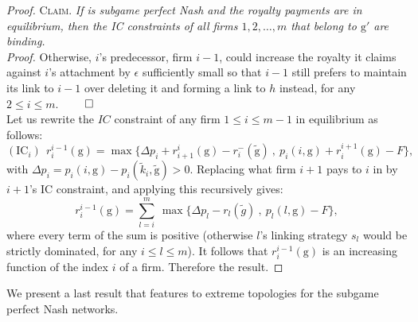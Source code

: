 \documentclass{article}
\begin{document}
\begin{proof}
\indent \textsc{Claim.} \textit{If  is subgame perfect Nash and the royalty payments are in equilibrium, then the IC constraints of all firms $1,2,\ldots, m$ that belong to $\text{g}'$ are binding.}\\
\indent \textit{Proof.} Otherwise, $i$'s predecessor, firm $i-1$, could increase the royalty it claims against $i$'s attachment by $\epsilon$ sufficiently small so that $i-1$ still prefers to maintain its link to $i-1$ over deleting it and forming a link to $h$ instead, for any $2\leq i\leq m$. $\qed$ \\

Let us rewrite the $IC$ constraint of any firm $1\leq i\leq m-1$ in equilibrium as follows:
\begin{equation*}
(\text{IC}_i)~~ r^{i-1}_i(\text{g})= \max\{\Delta p_i+r^{i}_{i+1}(\text{g}) - r^-_i(\tilde{\text{g}})~,~ p_i(i,\text{g})+r^{i+1}_i(\text{g})-F\},
\end{equation*}
with $\Delta p_i=p_i(i,\text{g})-p_i(\tilde{k}_i,\tilde{\text{g}})>0$. Replacing what firm $i+1$ pays to $i$ in  by $i+1$'s IC constraint, and applying this recursively gives: 
\begin{equation*}
r^{i-1}_i(\text{g})= \sum_{l=i}^{m} ~\max\{\Delta p_l - r_l(\tilde{g}) ~,~ p_l(l,\text{g})-F\},
\end{equation*}
where every term of the sum is positive (otherwise $l$'s linking strategy $s_l$ would be strictly dominated, for any $i\leq l\leq m$). It follows that $r^{i-1}_i(\text{g})$ is an increasing function of the index $i$ of a firm. Therefore the result. 
\end{proof}


\indent We present a last result that features to extreme topologies for the subgame perfect Nash networks. \\
\end{document}

